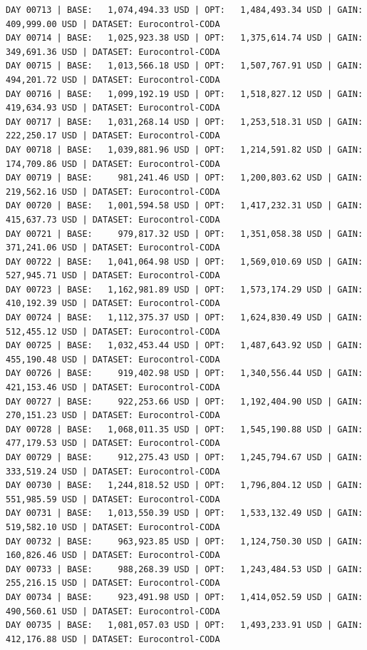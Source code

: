 \documentclass[11pt,a4paper]{article}
\begin{document}
\begin{verbatim}
DAY 00713 | BASE:   1,074,494.33 USD | OPT:   1,484,493.34 USD | GAIN: 409,999.00 USD | DATASET: Eurocontrol-CODA
DAY 00714 | BASE:   1,025,923.38 USD | OPT:   1,375,614.74 USD | GAIN: 349,691.36 USD | DATASET: Eurocontrol-CODA
DAY 00715 | BASE:   1,013,566.18 USD | OPT:   1,507,767.91 USD | GAIN: 494,201.72 USD | DATASET: Eurocontrol-CODA
DAY 00716 | BASE:   1,099,192.19 USD | OPT:   1,518,827.12 USD | GAIN: 419,634.93 USD | DATASET: Eurocontrol-CODA
DAY 00717 | BASE:   1,031,268.14 USD | OPT:   1,253,518.31 USD | GAIN: 222,250.17 USD | DATASET: Eurocontrol-CODA
DAY 00718 | BASE:   1,039,881.96 USD | OPT:   1,214,591.82 USD | GAIN: 174,709.86 USD | DATASET: Eurocontrol-CODA
DAY 00719 | BASE:     981,241.46 USD | OPT:   1,200,803.62 USD | GAIN: 219,562.16 USD | DATASET: Eurocontrol-CODA
DAY 00720 | BASE:   1,001,594.58 USD | OPT:   1,417,232.31 USD | GAIN: 415,637.73 USD | DATASET: Eurocontrol-CODA
DAY 00721 | BASE:     979,817.32 USD | OPT:   1,351,058.38 USD | GAIN: 371,241.06 USD | DATASET: Eurocontrol-CODA
DAY 00722 | BASE:   1,041,064.98 USD | OPT:   1,569,010.69 USD | GAIN: 527,945.71 USD | DATASET: Eurocontrol-CODA
DAY 00723 | BASE:   1,162,981.89 USD | OPT:   1,573,174.29 USD | GAIN: 410,192.39 USD | DATASET: Eurocontrol-CODA
DAY 00724 | BASE:   1,112,375.37 USD | OPT:   1,624,830.49 USD | GAIN: 512,455.12 USD | DATASET: Eurocontrol-CODA
DAY 00725 | BASE:   1,032,453.44 USD | OPT:   1,487,643.92 USD | GAIN: 455,190.48 USD | DATASET: Eurocontrol-CODA
DAY 00726 | BASE:     919,402.98 USD | OPT:   1,340,556.44 USD | GAIN: 421,153.46 USD | DATASET: Eurocontrol-CODA
DAY 00727 | BASE:     922,253.66 USD | OPT:   1,192,404.90 USD | GAIN: 270,151.23 USD | DATASET: Eurocontrol-CODA
DAY 00728 | BASE:   1,068,011.35 USD | OPT:   1,545,190.88 USD | GAIN: 477,179.53 USD | DATASET: Eurocontrol-CODA
DAY 00729 | BASE:     912,275.43 USD | OPT:   1,245,794.67 USD | GAIN: 333,519.24 USD | DATASET: Eurocontrol-CODA
DAY 00730 | BASE:   1,244,818.52 USD | OPT:   1,796,804.12 USD | GAIN: 551,985.59 USD | DATASET: Eurocontrol-CODA
DAY 00731 | BASE:   1,013,550.39 USD | OPT:   1,533,132.49 USD | GAIN: 519,582.10 USD | DATASET: Eurocontrol-CODA
DAY 00732 | BASE:     963,923.85 USD | OPT:   1,124,750.30 USD | GAIN: 160,826.46 USD | DATASET: Eurocontrol-CODA
DAY 00733 | BASE:     988,268.39 USD | OPT:   1,243,484.53 USD | GAIN: 255,216.15 USD | DATASET: Eurocontrol-CODA
DAY 00734 | BASE:     923,491.98 USD | OPT:   1,414,052.59 USD | GAIN: 490,560.61 USD | DATASET: Eurocontrol-CODA
DAY 00735 | BASE:   1,081,057.03 USD | OPT:   1,493,233.91 USD | GAIN: 412,176.88 USD | DATASET: Eurocontrol-CODA

\end{verbatim}
\end{document}
